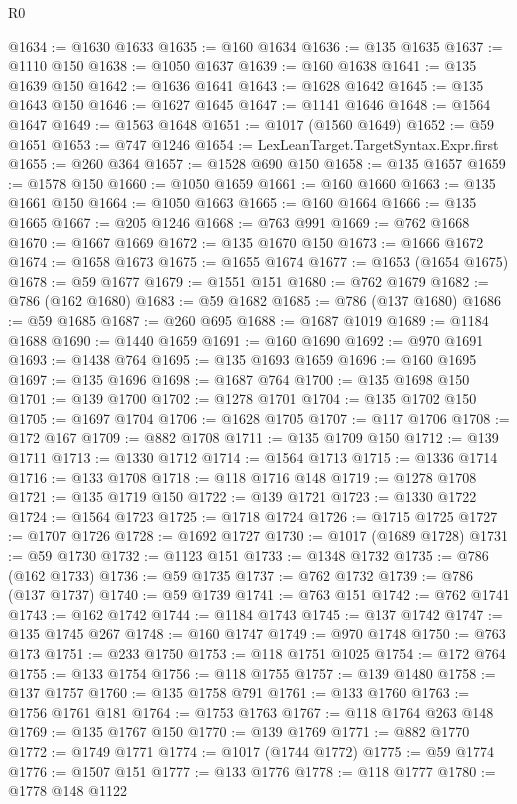 \begin{lexlean}{R0}
\begin{coremodule}
@1634 := @1630 @1633
@1635 := @160 @1634
@1636 := @135 @1635
@1637 := @1110 @150
@1638 := @1050 @1637
@1639 := @160 @1638
@1641 := @135 @1639 @150
@1642 := @1636 @1641
@1643 := @1628 @1642
@1645 := @135 @1643 @150
@1646 := @1627 @1645
@1647 := @1141 @1646
@1648 := @1564 @1647
@1649 := @1563 @1648
@1651 := @1017 (@1560 @1649)
@1652 := @59 @1651
@1653 := @747 @1246
@1654 := LexLeanTarget.TargetSyntax.Expr.first
@1655 := @260 @364
@1657 := @1528 @690 @150
@1658 := @135 @1657
@1659 := @1578 @150
@1660 := @1050 @1659
@1661 := @160 @1660
@1663 := @135 @1661 @150
@1664 := @1050 @1663
@1665 := @160 @1664
@1666 := @135 @1665
@1667 := @205 @1246
@1668 := @763 @991
@1669 := @762 @1668
@1670 := @1667 @1669
@1672 := @135 @1670 @150
@1673 := @1666 @1672
@1674 := @1658 @1673
@1675 := @1655 @1674
@1677 := @1653 (@1654 @1675)
@1678 := @59 @1677
@1679 := @1551 @151
@1680 := @762 @1679
@1682 := @786 (@162 @1680)
@1683 := @59 @1682
@1685 := @786 (@137 @1680)
@1686 := @59 @1685
@1687 := @260 @695
@1688 := @1687 @1019
@1689 := @1184 @1688
@1690 := @1440 @1659
@1691 := @160 @1690
@1692 := @970 @1691
@1693 := @1438 @764
@1695 := @135 @1693 @1659
@1696 := @160 @1695
@1697 := @135 @1696
@1698 := @1687 @764
@1700 := @135 @1698 @150
@1701 := @139 @1700
@1702 := @1278 @1701
@1704 := @135 @1702 @150
@1705 := @1697 @1704
@1706 := @1628 @1705
@1707 := @117 @1706
@1708 := @172 @167
@1709 := @882 @1708
@1711 := @135 @1709 @150
@1712 := @139 @1711
@1713 := @1330 @1712
@1714 := @1564 @1713
@1715 := @1336 @1714
@1716 := @133 @1708
@1718 := @118 @1716 @148
@1719 := @1278 @1708
@1721 := @135 @1719 @150
@1722 := @139 @1721
@1723 := @1330 @1722
@1724 := @1564 @1723
@1725 := @1718 @1724
@1726 := @1715 @1725
@1727 := @1707 @1726
@1728 := @1692 @1727
@1730 := @1017 (@1689 @1728)
@1731 := @59 @1730
@1732 := @1123 @151
@1733 := @1348 @1732
@1735 := @786 (@162 @1733)
@1736 := @59 @1735
@1737 := @762 @1732
@1739 := @786 (@137 @1737)
@1740 := @59 @1739
@1741 := @763 @151
@1742 := @762 @1741
@1743 := @162 @1742
@1744 := @1184 @1743
@1745 := @137 @1742
@1747 := @135 @1745 @267
@1748 := @160 @1747
@1749 := @970 @1748
@1750 := @763 @173
@1751 := @233 @1750
@1753 := @118 @1751 @1025
@1754 := @172 @764
@1755 := @133 @1754
@1756 := @118 @1755
@1757 := @139 @1480
@1758 := @137 @1757
@1760 := @135 @1758 @791
@1761 := @133 @1760
@1763 := @1756 @1761 @181
@1764 := @1753 @1763
@1767 := @118 @1764 @263 @148
@1769 := @135 @1767 @150
@1770 := @139 @1769
@1771 := @882 @1770
@1772 := @1749 @1771
@1774 := @1017 (@1744 @1772)
@1775 := @59 @1774
@1776 := @1507 @151
@1777 := @133 @1776
@1778 := @118 @1777
@1780 := @1778 @148 @1122

\end{coremodule}
\end{lexlean}
